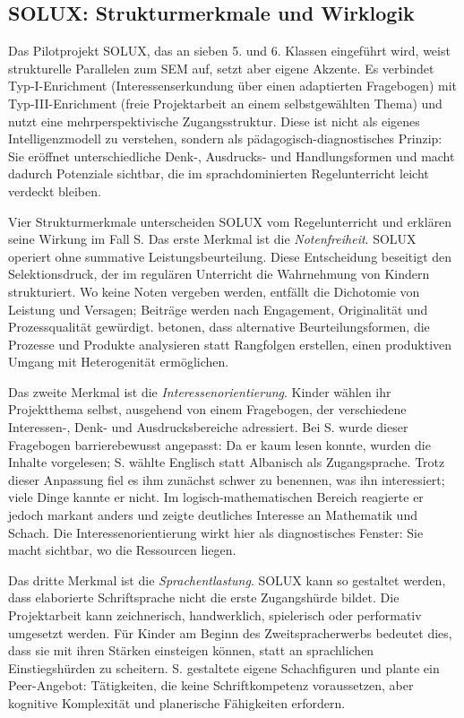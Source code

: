 \documentclass[ngerman, a4paper]{article}
\begin{document}
\subsection{SOLUX: Strukturmerkmale und Wirklogik}

Das Pilotprojekt SOLUX, das an sieben 5. und 6. Klassen eingeführt wird, weist
strukturelle Parallelen zum SEM auf, setzt aber eigene Akzente. Es verbindet
Typ-I-Enrichment (Interessenserkundung über einen adaptierten Fragebogen) mit
Typ-III-Enrichment (freie Projektarbeit an einem selbstgewählten Thema)
und nutzt eine mehrperspektivische Zugangsstruktur. Diese ist nicht
als eigenes Intelligenzmodell zu verstehen, sondern als
pädagogisch-diagnostisches Prinzip: Sie eröffnet unterschiedliche
Denk-, Ausdrucks- und Handlungsformen und macht dadurch Potenziale
sichtbar, die im sprachdominierten Regelunterricht leicht verdeckt
bleiben.

Vier Strukturmerkmale unterscheiden SOLUX vom Regelunterricht und erklären seine
Wirkung im Fall S. Das erste Merkmal ist die \textit{Notenfreiheit}. SOLUX operiert
ohne summative Leistungsbeurteilung. Diese Entscheidung beseitigt den
Selektionsdruck, der im regulären Unterricht die Wahrnehmung von Kindern strukturiert.
Wo keine Noten vergeben werden, entfällt die Dichotomie von Leistung und Versagen;
Beiträge werden nach Engagement, Originalität und Prozessqualität gewürdigt.
\textcite[S.\,10]{buholzerkummerwyss2010heterogenitaet} betonen, dass alternative Beurteilungsformen, die Prozesse
und Produkte analysieren statt Rangfolgen erstellen, einen produktiven Umgang mit
Heterogenität ermöglichen.

Das zweite Merkmal ist die \textit{Interessenorientierung}. Kinder wählen ihr
Projektthema selbst, ausgehend von einem Fragebogen, der verschiedene
Interessen-, Denk- und Ausdrucksbereiche adressiert. Bei S. wurde dieser Fragebogen barrierebewusst
angepasst: Da er kaum lesen konnte, wurden die Inhalte vorgelesen; S. wählte
Englisch statt Albanisch als Zugangsprache. Trotz dieser Anpassung fiel es ihm
zunächst schwer zu benennen, was ihn interessiert; viele Dinge kannte er nicht.
Im logisch-mathematischen Bereich reagierte er jedoch markant anders und zeigte
deutliches Interesse an Mathematik und Schach. Die Interessenorientierung wirkt
hier als diagnostisches Fenster: Sie macht sichtbar, wo die Ressourcen liegen.

Das dritte Merkmal ist die \textit{Sprachentlastung}. SOLUX kann so gestaltet werden,
dass elaborierte Schriftsprache nicht die erste Zugangshürde bildet. Die Projektarbeit kann zeichnerisch, handwerklich,
spielerisch oder performativ umgesetzt werden. Für Kinder am Beginn des
Zweitspracherwerbs bedeutet dies, dass sie mit ihren Stärken einsteigen können,
statt an sprachlichen Einstiegshürden zu scheitern. S. gestaltete eigene
Schachfiguren und plante ein Peer-Angebot: Tätigkeiten, die keine Schriftkompetenz
voraussetzen, aber kognitive Komplexität und planerische Fähigkeiten erfordern.
\end{document}
